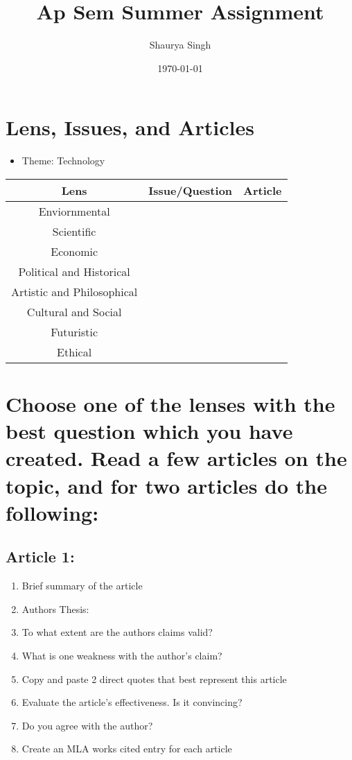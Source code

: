 \documentclass[11pt]{article}
\author{Shaurya Singh}
\date{\today}
\title{Ap Sem Summer Assignment}
\begin{document}
\maketitle
\setcounter{tocdepth}{2}
\tableofcontents


\section{Lens, Issues, and Articles}
\label{sec:orgeb598f8}
\begin{itemize}
\item Theme: Technology
\end{itemize}

\begin{center}
\begin{tabular}{|c|c|c|}
Lens & Issue/Question & Article\\
\hline
Enviornmental &  & \\
\hline
Scientific &  & \\
\hline
Economic &  & \\
\hline
Political and Historical &  & \\
\hline
Artistic and Philosophical &  & \\
\hline
Cultural and Social &  & \\
\hline
Futuristic &  & \\
\hline
Ethical &  & \\
\end{tabular}
\end{center}

\section{Choose one of the lenses with the best question which you have created. Read a few articles on the topic, and for two articles do the following:}
\label{sec:org79482b3}
\subsection{Article 1:}
\label{sec:org0aa5787}
\begin{enumerate}
\item Brief summary of the article
\item Authors Thesis:
\item To what extent are the authors claims valid?
\item What is one weakness with the author's claim?
\item Copy and paste 2 direct quotes that best represent this article
\item Evaluate the article's effectiveness. Is it convincing?
\item Do you agree with the author?
\item Create an MLA works cited entry for each article
\end{enumerate}
\end{document}

